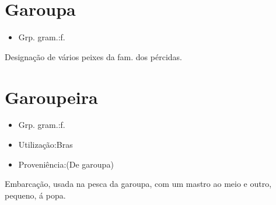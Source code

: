 \section{Garoupa}
\begin{itemize}
\item {Grp. gram.:f.}
\end{itemize}
Designação de vários peixes da fam. dos pércidas.
\section{Garoupeira}
\begin{itemize}
\item {Grp. gram.:f.}
\end{itemize}
\begin{itemize}
\item {Utilização:Bras}
\end{itemize}
\begin{itemize}
\item {Proveniência:(De \textunderscore garoupa\textunderscore )}
\end{itemize}
Embarcação, usada na pesca da garoupa, com um mastro ao meio e outro, pequeno, á popa.
